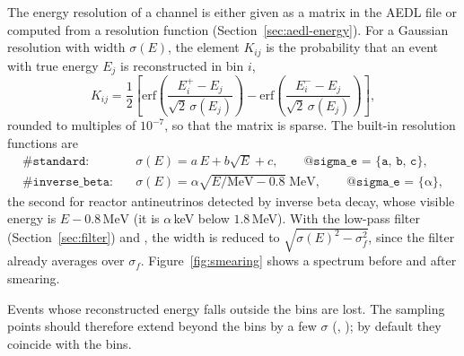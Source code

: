 The energy resolution of a channel is either given as a matrix in the AEDL
file or computed from a resolution function (Section~\ref{sec:aedl-energy}).
For a Gaussian resolution with width $\sigma(E)$, the element $K_{ij}$ is the
probability that an event with true energy $E_j$ is reconstructed in bin $i$,
\begin{equation}
K_{ij} = \frac12\left[\mathrm{erf}\!\left(\frac{E^+_i-E_j}{\sqrt2\,\sigma(E_j)}\right)
                   -\mathrm{erf}\!\left(\frac{E^-_i-E_j}{\sqrt2\,\sigma(E_j)}\right)\right],
\label{eq:smear}
\end{equation}
rounded to multiples of $10^{-7}$, so that the matrix is sparse. The built-in
resolution functions are
\begin{align}
\texttt{\#standard:}\quad & \sigma(E) = a\,E + b\sqrt{E} + c, \qquad \texttt{@sigma\_e = \{a, b, c\}},\\
\texttt{\#inverse\_beta:}\quad & \sigma(E) = \alpha\sqrt{E/\mathrm{MeV} - 0.8}\;\mathrm{MeV}, \qquad \texttt{@sigma\_e = \{α\}},
\end{align}
the second for reactor antineutrinos detected by inverse beta decay, whose
visible energy is $E-0.8\,\mathrm{MeV}$ (it is $\alpha\,$keV below $1.8\,$MeV).
With the low-pass filter (Section~\ref{sec:filter}) and , the
width is reduced to $\sqrt{\sigma(E)^2-\sigma_f^2}$, since the filter already
averages over $\sigma_f$. Figure~\ref{fig:smearing} shows a spectrum before and
after smearing.

Events whose reconstructed energy falls outside the bins are lost. The
sampling points should therefore extend beyond the bins by a few $\sigma$
(, ); by default they coincide with
the bins.
